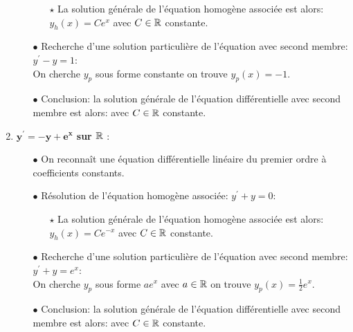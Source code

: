\documentclass[a4paper, 11pt,reqno]{article}
\begin{document}
\begin{correction}
\begin{enumerate}
\begin{itemize}
\begin{itemize}
                    \item[$\star$] La solution g\'en\'erale de l'\'equation homog\`{e}ne associ\'ee est alors: $y_h(x) = Ce^{x}$ avec $C\in\mathbb{R}$ constante.
                  \end{itemize}
            \item[$\bullet$] Recherche d'une solution particuli\`{e}re de l'\'equation avec second membre: $y^{\prime}-y=1$:\\
                  \noindent On cherche $y_p$ sous forme constante on trouve $y_p(x)= -1$.
            \item[$\bullet$] Conclusion: la solution g\'en\'erale de l'\'equation diff\'erentielle avec second membre est alors:  avec $C\in\mathbb{R}$ constante.
          \end{itemize}

    \item \textbf{$\mathbf{y^{\prime}=-y+e^x}$ sur $\mathbb{R}$} :\\
          \begin{itemize}
            \item[$\bullet$] On reconna\^{i}t une \'equation diff\'erentielle lin\'eaire du premier ordre \`{a} coefficients  constants.
            \item[$\bullet$] R\'esolution de l'\'equation homog\`{e}ne associ\'ee: $y^{\prime}+y=0 $:\\
                  \begin{itemize}

                    \item[$\star$] La solution g\'en\'erale de l'\'equation homog\`{e}ne associ\'ee est alors: $y_h(x) = Ce^{-x}$ avec $C\in\mathbb{R}$ constante.
                  \end{itemize}
            \item[$\bullet$] Recherche d'une solution particuli\`{e}re de l'\'equation avec second membre: $y^{\prime}+y=e^x$:\\
                  \noindent On cherche $y_p$ sous forme $ae^x$ avec $a\in \mathbb{R}$ on trouve $y_p(x)= \frac{1}{2}e^x$.
            \item[$\bullet$] Conclusion: la solution g\'en\'erale de l'\'equation diff\'erentielle avec second membre est alors:  avec $C\in\mathbb{R}$ constante.
          \end{itemize}
  \end{enumerate}
\end{correction}
\end{document}
